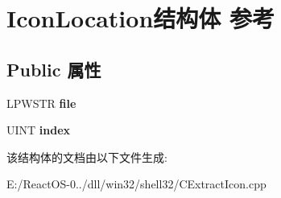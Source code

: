 \hypertarget{struct_icon_location}{}\section{Icon\+Location结构体 参考}
\label{struct_icon_location}
\subsection*{Public 属性}
\begin{DoxyCompactItemize}
\item 
\mbox{\label{struct_icon_location_a3751dd85ea1f17c8f01528d3b2654afa}} 
L\+P\+W\+S\+TR {\bfseries file}
\item 
\mbox{\label{struct_icon_location_abd9c343d43246ec4bd2f7032432bf01b}} 
U\+I\+NT {\bfseries index}
\end{DoxyCompactItemize}


该结构体的文档由以下文件生成\+:\begin{DoxyCompactItemize}
\item 
E\+:/\+React\+O\+S-\/0../dll/win32/shell32/C\+Extract\+Icon.\+cpp\end{DoxyCompactItemize}
